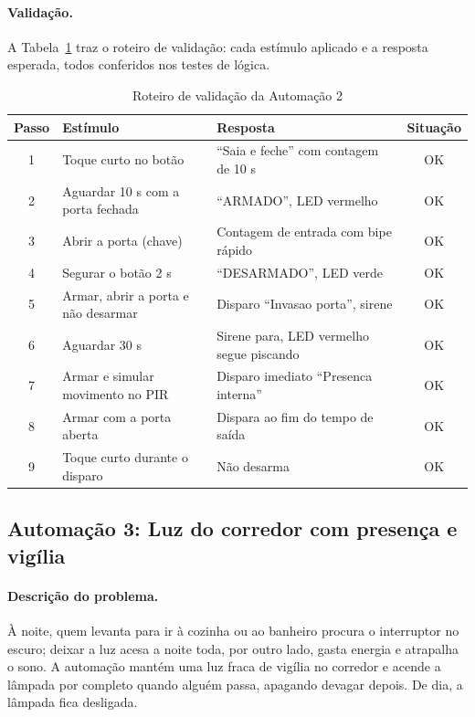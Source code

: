 \documentclass[12pt]{article}
\begin{document}
\paragraph{Validação.} A Tabela~\ref{tab:val2} traz o roteiro de validação: cada estímulo aplicado e a resposta esperada, todos conferidos nos testes de lógica.

\begin{table}[ht]
\centering
\caption{Roteiro de validação da Automação 2}\label{tab:val2}
\footnotesize
\begin{tabularx}{\textwidth}{cXXc}
\toprule
Passo & Estímulo & Resposta & Situação \\
\midrule
1 & Toque curto no botão & ``Saia e feche'' com contagem de 10 s & OK \\
2 & Aguardar 10 s com a porta fechada & ``ARMADO'', LED vermelho & OK \\
3 & Abrir a porta (chave) & Contagem de entrada com bipe rápido & OK \\
4 & Segurar o botão 2 s & ``DESARMADO'', LED verde & OK \\
5 & Armar, abrir a porta e não desarmar & Disparo ``Invasao porta'', sirene & OK \\
6 & Aguardar 30 s & Sirene para, LED vermelho segue piscando & OK \\
7 & Armar e simular movimento no PIR & Disparo imediato ``Presenca interna'' & OK \\
8 & Armar com a porta aberta & Dispara ao fim do tempo de saída & OK \\
9 & Toque curto durante o disparo & Não desarma & OK \\
\bottomrule
\end{tabularx}
\end{table}

\subsection{Automação 3: Luz do corredor com presença e vigília}\label{sub:a3}

\paragraph{Descrição do problema.} À noite, quem levanta para ir à cozinha ou ao banheiro procura o interruptor no escuro; deixar a luz acesa a noite toda, por outro lado, gasta energia e atrapalha o sono. A automação mantém uma luz fraca de vigília no corredor e acende a lâmpada por completo quando alguém passa, apagando devagar depois. De dia, a lâmpada fica desligada.
\end{document}
